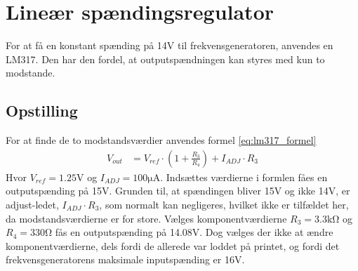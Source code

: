 \section{Lineær spændingsregulator}\label{sec:lm317}
For at få en konstant spænding på 14\si{\volt} til frekvensgeneratoren, anvendes en LM317. Den har den fordel, at outputspændningen kan styres med kun to modstande.
\subsection{Opstilling}
For at finde de to modstandsværdier anvendes formel \ref{eq:lm317_formel}
\begin{align}
	V_{out} & = V_{ref} \cdot \left( 1 + \frac{R_3}{R_4} \right) + I_{ADJ} \cdot R_3 \label{eq:lm317_formel}
\end{align}
Hvor $V_{ref} = 1.25\si{\volt}$ og $I_{ADJ} = 100\si{\micro\ampere}$. Indsættes værdierne i formlen fåes en outputspænding på 15\si{\volt}. Grunden til, at spændingen bliver 15\si{\volt} og ikke 14\si{\volt}, er adjust-ledet, $I_{ADJ} \cdot R_3$, som normalt kan negligeres, hvilket ikke er tilfældet her, da modstandsværdierne er for store. Vælges komponentværdierne $R_3 = 3.3\si{\kilo\ohm}$ og $R_4 = 330\si{\ohm}$ fås en outputspænding på 14.08\si{\volt}. Dog vælges der ikke at ændre komponentværdierne, dels fordi de allerede var loddet på printet, og fordi det frekvensgeneratorens maksimale inputspænding er 16\si{\volt}.